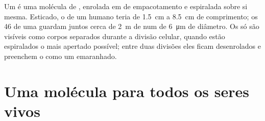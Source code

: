 \begin{proposition}[Os cromossomos]\label{prop:g10:universal-dna:chromosome}
Um  é uma molécula de , enrolada em  de
empacotamento e espiralada sobre si mesma. Esticado, o  de um
 humano teria de \qty{1.5}{cm} a \qty{8.5}{cm} de
comprimento; os 46  de uma  guardam juntos cerca de
\qty{2}{m} de  num  de \qty{6}{\micro m} de diâmetro. Os
 só são visíveis como corpos separados durante a divisão
celular, quando estão espiralados o mais apertado possível; entre duas
divisões eles ficam desenrolados e preenchem o  como um emaranhado.
\end{proposition}
\admitted

\section{Uma molécula para todos os seres vivos}

